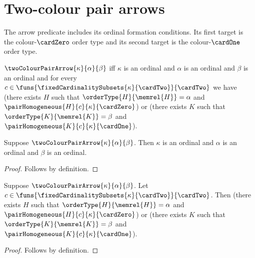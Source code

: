 \section{Two-colour pair arrows}







The arrow predicate includes its ordinal formation conditions.  Its first
target is the colour-$\cardZero$ order type and its second target is the
colour-$\cardOne$ order type.

\begin{definition}\label{two_colour_pair_arrow}
    $\twoColourPairArrow{\kappa}{\alpha}{\beta}$ iff
        $\kappa$ is an ordinal and $\alpha$ is an ordinal and
        $\beta$ is an ordinal and
        for every
            $c\in\funs{\fixedCardinalitySubsets{\kappa}{\cardTwo}}
                {\cardTwo}$ we have
            (there exists $H$ such that
                $\orderType{H}{\memrel{H}}=\alpha$ and
                $\pairHomogeneous{H}{c}{\kappa}{\cardZero}$) or
            (there exists $K$ such that
                $\orderType{K}{\memrel{K}}=\beta$ and
                $\pairHomogeneous{K}{c}{\kappa}{\cardOne}$).
\end{definition}

\begin{proposition}\label{two_colour_pair_arrow_ordinals}
    Suppose $\twoColourPairArrow{\kappa}{\alpha}{\beta}$.
    Then $\kappa$ is an ordinal and $\alpha$ is an ordinal and
        $\beta$ is an ordinal.
\end{proposition}
\begin{proof}
    Follows by definition.
\end{proof}

\begin{proposition}\label{two_colour_pair_arrow_elim}
    Suppose $\twoColourPairArrow{\kappa}{\alpha}{\beta}$.
    Let $c\in\funs{\fixedCardinalitySubsets{\kappa}{\cardTwo}}
        {\cardTwo}$.
    Then (there exists $H$ such that
            $\orderType{H}{\memrel{H}}=\alpha$ and
            $\pairHomogeneous{H}{c}{\kappa}{\cardZero}$) or
        (there exists $K$ such that
            $\orderType{K}{\memrel{K}}=\beta$ and
            $\pairHomogeneous{K}{c}{\kappa}{\cardOne}$).
\end{proposition}
\begin{proof}
    Follows by definition.
\end{proof}

